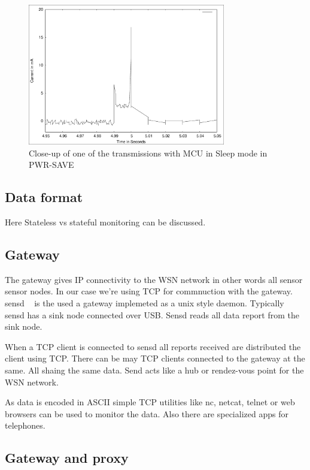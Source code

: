 \documentclass[conference, a4paper,10pt,twocolumn]{IEEEtran}
\begin{document}
\begin{figure}
\centering
    \includegraphics[width=3.4in]{bcast-detail.eps}
    \caption{Close-up of one of the transmissions with MCU in Sleep mode in PWR-SAVE}
    \label{fig:bcast-detail}
\end{figure}



\subsection{Data format}
Here
Stateless vs stateful monitoring can be discussed. 


\subsection{Gateway}
The gateway gives IP connectivity to the WSN network  in other words 
all sensor sensor nodes. In our case we're using TCP for commnuction 
with the gateway.  sensd ~\cite{sensd} is the used a gateway implemeted
as a unix style daemon. Typically sensd has a sink node connected over 
USB. Sensd reads all data report from the sink node. 

When a TCP client is connected to sensd all reports received are 
distributed the client using TCP. There can be may TCP clients 
connected to the gateway at the same. All shaing the same data.
Send acts like a hub or rendez-vous point for the WSN  network.

As data is encoded in ASCII simple TCP utilities like nc, netcat, 
telnet or web browsers can be used to monitor the data. Also there 
are specialized apps for telephones. 

\subsection{Gateway and proxy}
\end{document}
